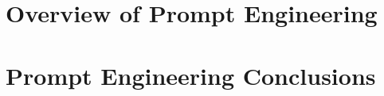 \section[Overview]{Overview of Prompt Engineering}


\section[Concl]{Prompt Engineering Conclusions}
